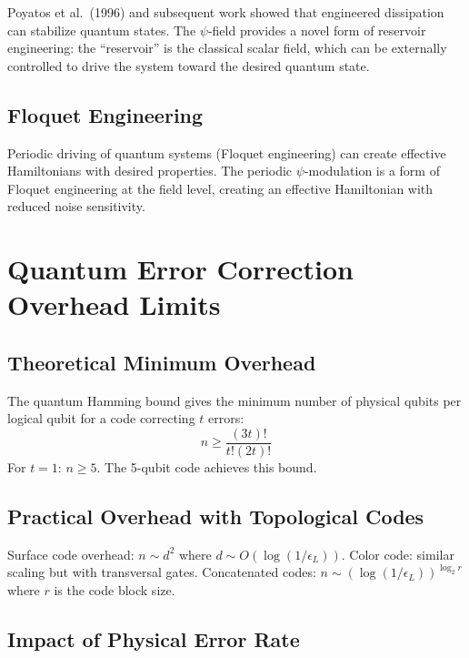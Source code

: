 \documentclass[11pt,letterpaper]{article}
\begin{document}
Poyatos et al.\ (1996) and subsequent work showed that engineered
dissipation can stabilize quantum states. The $\psi$-field provides a
novel form of reservoir engineering: the ``reservoir'' is the classical
scalar field, which can be externally controlled to drive the system
toward the desired quantum state.

\subsection{Floquet Engineering}

Periodic driving of quantum systems (Floquet engineering) can create
effective Hamiltonians with desired properties. The periodic $\psi$-modulation
is a form of Floquet engineering at the field level, creating an effective
Hamiltonian with reduced noise sensitivity.

\section{Quantum Error Correction Overhead Limits}

\subsection{Theoretical Minimum Overhead}

The quantum Hamming bound gives the minimum number of physical qubits
per logical qubit for a code correcting $t$ errors:
\begin{equation}
n \geq \frac{(3t)!}{t!(2t)!}
\end{equation}
For $t = 1$: $n \geq 5$. The 5-qubit code achieves this bound.

\subsection{Practical Overhead with Topological Codes}

Surface code overhead: $n \sim d^2$ where $d \sim O(\log(1/\epsilon_L))$.
Color code: similar scaling but with transversal gates.
Concatenated codes: $n \sim (\log(1/\epsilon_L))^{\log_2 r}$ where $r$ is
the code block size.

\subsection{Impact of Physical Error Rate}
\end{document}
